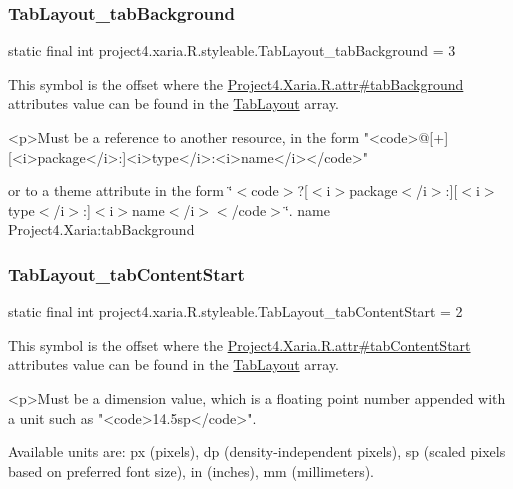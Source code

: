 \subsubsection{\texorpdfstring{Tab\+Layout\+\_\+tab\+Background}{TabLayout\_tabBackground}}
{\footnotesize\ttfamily static final int project4.\+xaria.\+R.\+styleable.\+Tab\+Layout\+\_\+tab\+Background = 3\hspace{0.3cm}{\ttfamily [static]}}

This symbol is the offset where the \hyperlink{}{Project4.\+Xaria.\+R.\+attr\#tab\+Background} attribute\textquotesingle{}s value can be found in the \hyperlink{classproject4_1_1xaria_1_1R_1_1styleable_ab6bfb1f97ae9fba16f4f90d50871d4a8}{Tab\+Layout} array.

\begin{DoxyVerb}      <p>Must be a reference to another resource, in the form "<code>@[+][<i>package</i>:]<i>type</i>:<i>name</i></code>"
\end{DoxyVerb}
 or to a theme attribute in the form \char`\"{}$<$code$>$?\mbox{[}$<$i$>$package$<$/i$>$\+:\mbox{]}\mbox{[}$<$i$>$type$<$/i$>$\+:\mbox{]}$<$i$>$name$<$/i$>$$<$/code$>$\char`\"{}.  name Project4.\+Xaria\+:tab\+Background \mbox{\label{classproject4_1_1xaria_1_1R_1_1styleable_ab07111454d6d47d52b6dd2500f672524}} 
\subsubsection{\texorpdfstring{Tab\+Layout\+\_\+tab\+Content\+Start}{TabLayout\_tabContentStart}}
{\footnotesize\ttfamily static final int project4.\+xaria.\+R.\+styleable.\+Tab\+Layout\+\_\+tab\+Content\+Start = 2\hspace{0.3cm}{\ttfamily [static]}}

This symbol is the offset where the \hyperlink{}{Project4.\+Xaria.\+R.\+attr\#tab\+Content\+Start} attribute\textquotesingle{}s value can be found in the \hyperlink{classproject4_1_1xaria_1_1R_1_1styleable_ab6bfb1f97ae9fba16f4f90d50871d4a8}{Tab\+Layout} array.

\begin{DoxyVerb}      <p>Must be a dimension value, which is a floating point number appended with a unit such as "<code>14.5sp</code>".
\end{DoxyVerb}
 Available units are\+: px (pixels), dp (density-\/independent pixels), sp (scaled pixels based on preferred font size), in (inches), mm (millimeters). 

